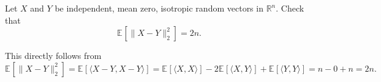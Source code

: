 \begin{problem*}[Exercise 3.2.6]\label{ex3.2.6}
	Let \(X\) and \(Y\) be independent, mean zero, isotropic random vectors in \(\mathbb{R} ^n\). Check that
	\[
		\mathbb{E}_{}[\lVert X - Y \rVert _2^2]
		= 2n.
	\]
\end{problem*}
\begin{answer}
	This directly follows from
	\[
		\mathbb{E}_{}[\lVert X - Y \rVert _2^2]
		= \mathbb{E}_{}[\langle X-Y, X-Y \rangle ]
		= \mathbb{E}_{}[\langle X, X \rangle ] - 2 \mathbb{E}_{}[\langle X, Y \rangle ] + \mathbb{E}_{}[\langle Y, Y \rangle ]
		= n - 0 + n
		= 2n.
	\]
\end{answer}